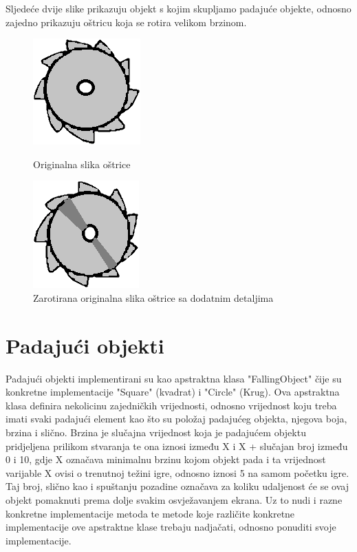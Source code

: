 \documentclass[times, utf8, zavrsni]{fer}
\begin{document}
	Sljedeće dvije slike prikazuju objekt s kojim skupljamo padajuće objekte, odnosno zajedno prikazuju oštricu koja se rotira velikom brzinom.
	
	
		\begin{figure}[!htb]
			\begin{minipage}{0.48\textwidth}
				\centering
				\includegraphics[scale=0.6]{"slike/saw1.png"} 
				\caption{Originalna slika oštrice}
				\label{fig:saw1}
			\end{minipage}\hfill
			\begin{minipage}{0.48\textwidth}
				\centering
				\includegraphics[scale=0.6]{"slike/saw2.png"} 
				\caption{Zarotirana originalna slika oštrice sa dodatnim detaljima}
				\label{fig:saw2}
			\end{minipage}
		\end{figure}
	
	\section{Padajući objekti}
	Padajući objekti implementirani su kao apstraktna klasa "FallingObject" čije su konkretne implementacije "Square" (kvadrat) i "Circle" (Krug). Ova apstraktna klasa definira nekolicinu zajedničkih vrijednosti, 
	odnosno vrijednost koju treba imati svaki padajući element kao što su položaj padajućeg objekta, njegova boja, brzina i slično.
	Brzina je slučajna vrijednost koja je padajućem objektu pridjeljena prilikom stvaranja te ona iznosi između X i X + slučajan broj između 0 i 10, gdje X označava minimalnu brzinu kojom objekt pada i ta vrijednost
	varijable X ovisi o trenutnoj težini igre, odnosno iznosi 5 na samom početku igre. Taj broj, slično kao i spuštanju pozadine označava za koliku udaljenost će se ovaj objekt pomaknuti prema dolje svakim osvježavanjem ekrana.
	Uz to nudi i razne konkretne implementacije metoda te metode koje različite konkretne implementacije ove apstraktne klase trebaju nadjačati, odnosno ponuditi svoje implementacije. 
	
\end{document}
